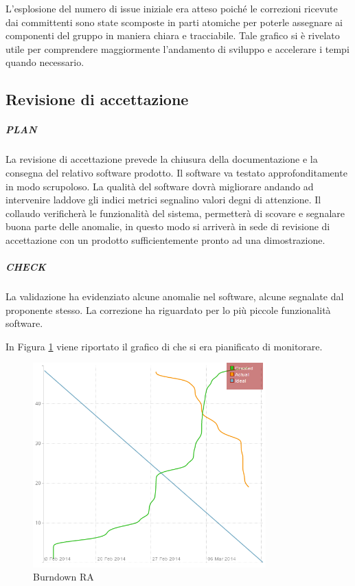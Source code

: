 	L'esplosione del numero di issue iniziale era atteso poiché le correzioni ricevute dai committenti sono state scomposte in parti atomiche per poterle assegnare ai componenti del gruppo in maniera chiara e tracciabile. Tale grafico si è rivelato utile per comprendere maggiormente l'andamento di sviluppo e accelerare i tempi quando necessario.




\subsection{Revisione di accettazione}
	\subparagraph{PLAN}
	La revisione di accettazione prevede la chiusura della documentazione e la consegna del relativo software prodotto. Il software va testato approfonditamente in modo scrupoloso. La qualità del software dovrà migliorare andando ad intervenire laddove gli indici metrici segnalino valori degni di attenzione. Il collaudo verificherà le funzionalità del sistema, permetterà di scovare e segnalare buona parte delle anomalie, in questo modo si arriverà in sede di revisione di accettazione con un prodotto sufficientemente pronto ad una dimostrazione.
	
	\subparagraph{CHECK}
	La validazione ha evidenziato alcune anomalie nel software, alcune segnalate dal proponente stesso. La correzione ha riguardato per lo più piccole funzionalità software.
	

	In Figura \ref{fig:burndownRA} viene riportato il grafico di  che si era pianificato di monitorare.
	
	\begin{figure}[H]
		\centering \includegraphics[width=0.8\textwidth]{burndownRQ.png}
		\caption{Burndown RA}
		\label{fig:burndownRA}
	\end{figure}
